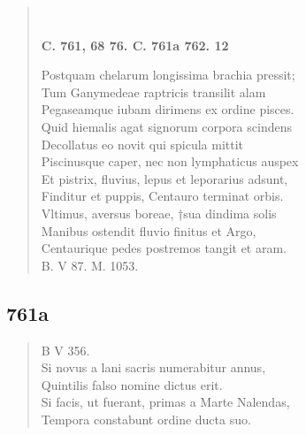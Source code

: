 \documentclass[11pt, a4paper]{report}
\begin{document}
\begin{verse}
        ﻿\pagebreak 
    \begin{center} \textbf{C. 761, 68 76. C. 761a 762. 12} \end{center} \marginpar{[246]} Postquam chelarum longissima brachia pressit; \\ Tum Ganymedeae raptricis transilit alam \\ Pegaseamque iubam dirimens ex ordine pisces. \\ Quid hiemalis agat signorum corpora scindens \\ Decollatus eo novit qui spicula mittit \\ Piscinusque caper, nec non lymphaticus auspex \\ Et pistrix, fluvius, lepus et leporarius adsunt, \\ Finditur et puppis, Centauro terminat orbis. \\ Vltimus, aversus boreae, †sua dindima solis \\ Manibus ostendit fluvio finitus et Argo, \\ Centaurique pedes postremos tangit et aram. \\ B. V 87. M. 1053. \\ 
      \end{verse}
  
            \subsection*{761a}
      \begin{verse}
      B V 356. \\ Si novus a lani sacris numerabitur annus, \\ Quintilis falso nomine dictus erit. \\ Si facis, ut fuerant, primas a Marte Nalendas, \\ Tempora constabunt ordine ducta suo. \\ 
      \end{verse}
  
\end{document}
